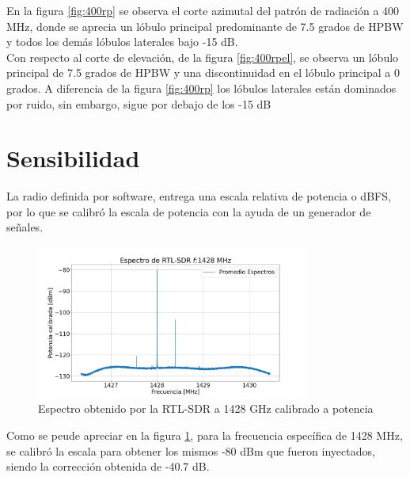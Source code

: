 En la figura \ref{fig:400rp} se observa el corte azimutal del patrón de radiación a 400 MHz, donde se aprecia un lóbulo principal predominante de 7.5 grados de HPBW y todos los demás lóbulos laterales bajo -15 dB.\\


Con respecto al corte de elevación, de la figura \ref{fig:400rpel}, se observa un lóbulo principal de 7.5 grados de HPBW y una discontinuidad en el lóbulo principal a 0 grados. A diferencia de la figura \ref{fig:400rp} los lóbulos laterales están dominados por ruido, sin embargo, sigue por debajo de los -15 dB\\



\section{Sensibilidad}

La radio definida por software, entrega una escala relativa de potencia o dBFS, por lo que se calibró la escala de potencia con la ayuda de un generador de señales.\\

\begin{figure}
    \centering
    \includegraphics[width=0.8\textwidth]{img/rtl1428}
    \caption{Espectro obtenido por la RTL-SDR a 1428 GHz calibrado a potencia}
    \label{fig:rtl1428}
\end{figure}

Como se peude apreciar en la figura \ref{fig:rtl1428}, para la frecuencia específica de 1428 MHz, se calibró la escala para obtener los mismos -80 dBm que fueron inyectados, siendo la corrección obtenida de -40.7 dB.\\

